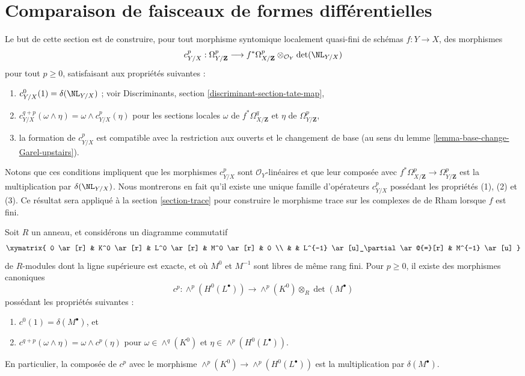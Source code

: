 \section{Comparaison de faisceaux de formes différentielles}
\label{section-quasi-finite-syntomic}

\noindent
Le but de cette section est de construire, pour tout morphisme syntomique
localement quasi-fini de schémas $f : Y \to X$, des morphismes
$$
c^p_{Y/X} :
\Omega^p_{Y/\mathbf{Z}}
\longrightarrow
f^*\Omega^p_{X/\mathbf{Z}} \otimes_{\mathcal{O}_Y} \det(\NL_{Y/X})
$$
pour tout $p \geq 0$, satisfaisant aux propriétés suivantes :
\begin{enumerate}
\item
\label{item-degree-zero}
$c_{Y/X}^0(1) = \delta(\NL_{Y/X})$ ; voir
Discriminants, section \ref{discriminant-section-tate-map},
\item
\label{item-multiplicative}
$c_{Y/X}^{q + p}(\omega \wedge \eta) = \omega \wedge c_{Y/X}^p(\eta)$
pour les sections locales $\omega$ de $f^*\Omega^q_{X/\mathbf{Z}}$
et $\eta$ de $\Omega^p_{Y/\mathbf{Z}}$,
\item
\label{item-base-change}
la formation de $c^p_{Y/X}$ est compatible avec la restriction aux ouverts
et le changement de base
(au sens du lemme \ref{lemma-base-change-Garel-upstairs}).
\end{enumerate}
Notons que ces conditions impliquent que les morphismes $c^p_{Y/X}$ sont
$\mathcal{O}_Y$-linéaires et que leur composée avec
$f^*\Omega^p_{X/\mathbf{Z}} \to \Omega^p_{Y/\mathbf{Z}}$
est la multiplication par $\delta(\NL_{Y/X})$.
Nous montrerons en fait qu'il existe une unique famille d'opérateurs
$c^p_{Y/X}$ possédant les propriétés (1), (2) et (3). Ce résultat sera appliqué à la
section \ref{section-trace} pour construire le morphisme trace sur
les complexes de de Rham lorsque $f$ est fini.

\begin{lemma}
\label{lemma-funny-map}
Soit $R$ un anneau, et considérons un diagramme commutatif
$$
\xymatrix{
0 \ar[r] &
K^0 \ar[r] &
L^0 \ar[r] &
M^0 \ar[r] & 0 \\
& & L^{-1} \ar[u]_\partial \ar@{=}[r] &
M^{-1} \ar[u]
}
$$
de $R$-modules dont la ligne supérieure est exacte, et où $M^0$ et $M^{-1}$
sont libres de même rang fini. Pour $p \geq 0$, il existe des morphismes canoniques
$$
c^p : 
\wedge^p(H^0(L^\bullet))
\longrightarrow
\wedge^p(K^0) \otimes_R \det(M^\bullet)
$$
possédant les propriétés suivantes :
\begin{enumerate}
\item $c^0(1) = \delta(M^\bullet)$, et
\item $c^{q + p}(\omega \wedge \eta) = \omega \wedge c^p(\eta)$
pour $\omega \in \wedge^q(K^0)$ et $\eta \in \wedge^p(H^0(L^\bullet))$.
\end{enumerate}
En particulier, la composée de $c^p$ avec le morphisme
$\wedge^p(K^0) \to \wedge^p(H^0(L^\bullet))$ est la multiplication
par $\delta(M^\bullet)$.
\end{lemma}

